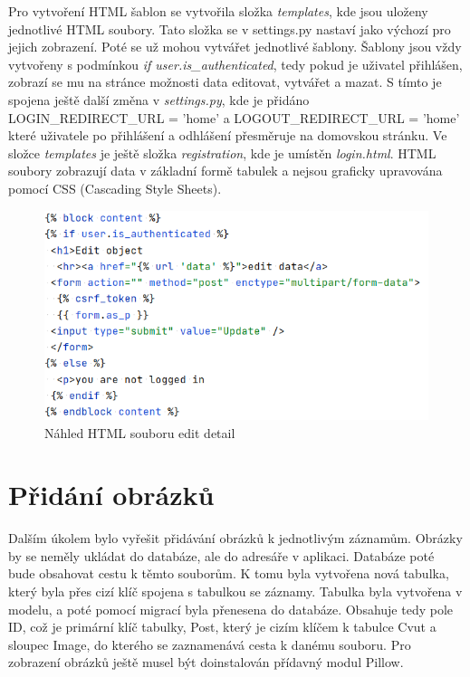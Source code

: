 Pro vytvoření HTML šablon se vytvořila složka \emph{templates}, kde
jsou uloženy jednotlivé HTML soubory. Tato složka se v settings.py
nastaví jako výchozí pro jejich zobrazení. Poté se už mohou vytvářet
jednotlivé šablony. Šablony jsou vždy vytvořeny s podmínkou \emph{if
  user.is\_authenticated}, tedy pokud je uživatel přihlášen, zobrazí
se mu na stránce možnosti data editovat, vytvářet a mazat. S tímto je
spojena ještě další změna v \emph{settings.py}, kde je přidáno
LOGIN\_REDIRECT\_URL = 'home' a LOGOUT\_REDIRECT\_URL
  = 'home' které uživatele po přihlášení a odhlášení přesměruje na
domovskou stránku. Ve složce \emph{templates} je ještě složka
\emph{registration}, kde je umístěn \emph{login.html}. HTML soubory
zobrazují data v základní formě tabulek a nejsou graficky upravována
pomocí CSS (Cascading Style Sheets).

\begin{figure}[H] \centering
    \includegraphics[width=350pt]{./pictures/8-edit-detail-html.PNG}
    \caption[Náhled HTML souboru edit detail]{Náhled HTML souboru edit detail}
	\label{fig:Náhled HTML souboru edit detail}
\end{figure}


\newpage

\section{Přidání obrázků}

Dalším úkolem bylo vyřešit přidávání obrázků k jednotlivým
záznamům. Obrázky by se neměly ukládat do databáze, ale do adresáře v
aplikaci. Databáze poté bude obsahovat cestu k těmto souborům. K tomu
byla vytvořena nová tabulka, který byla přes cizí klíč spojena s
tabulkou se záznamy. Tabulka byla vytvořena v modelu, a poté pomocí
migrací byla přenesena do databáze. Obsahuje tedy pole ID, což je
primární klíč tabulky, Post, který je cizím klíčem k tabulce Cvut a
sloupec Image, do kterého se zaznamenává cesta k danému souboru.
Pro zobrazení obrázků ještě musel být doinstalován přídavný modul Pillow. \cite{chaiken}


